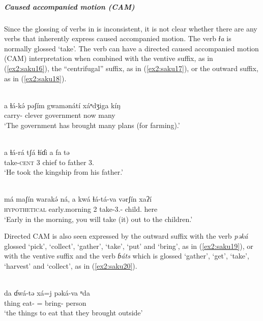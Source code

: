 \subparagraph{Caused accompanied motion (CAM)}

Since the glossing of verbs in \citet{thomasGrammarSakunSukur2014} is inconsistent, it is not clear whether there are any verbs that inherently express caused accompanied motion. The verb \textit{ɬa} is normally glossed `take'. The verb can have a directed caused accompanied motion (CAM) interpretation when combined with the ventive suffix, as in (\ref{ex2:saku16}), the ``centrifugal'' suffix, as in (\ref{ex2:saku17}), or the outward suffix, as in (\ref{ex2:saku18}).

\ea\label{ex2:saku16}
 \\
\gll  a ɬá-kə́ pəʃím gwamənátí xáⁿdʒiga kíŋ \\
 carry- clever government now many \\
\glt `The government has brought many plans (for farming).'

\ex\label{ex2:saku17}
 \\
\gll a	ɬá-rá	tʃá	ɬíɗi	a	fa	tə \\
	take-\textsc{cent}	3	chief	to	father	3. \\
\glt `He took the kingship from his father.'

\ex\label{ex2:saku18}
 \\
\gll má {maʃín warakə́} ná, a kwá ɬá-tá-va vərʃín xaʔí \\
\textsc{hypothetical} early.morning   2 take-3.- child. here		\\
\glt `Early in the morning, you will take (it) out to the children.'
\z 

Directed CAM is also seen expressed by the outward suffix with the verb \textit{pəká} glossed `pick', `collect', `gather', `take', `put' and `bring', as in (\ref{ex2:saku19}), or with the ventive suffix and the verb \textit{ɓáts} which is glossed `gather',  `get', `take', `harvest' and `collect', as in (\ref{ex2:saku20}).

\ea\label{ex2:saku19}
 \\
\gll da ɗwá-tə xá=j pəká-va ⁿda \\
thing eat- = bring- person \\
\glt `the things to eat that they brought outside'

